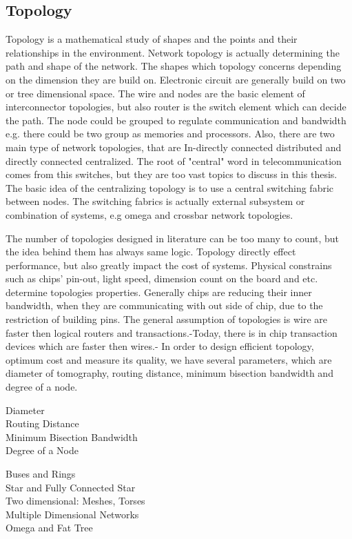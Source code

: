 \subsection{Topology}
Topology is a mathematical study of shapes and the points and their relationships in the environment. Network topology is actually determining the path and shape of the network. The shapes which topology concerns depending on the dimension they are build on. Electronic circuit are generally build on two or tree dimensional space. The wire and nodes are the basic element of interconnector topologies, but also router is the switch element which can decide the path. The node could be grouped to regulate communication and bandwidth e.g. there could be two group as memories and processors. Also, there are two main type of network topologies, that are In-directly connected distributed and directly connected centralized. The root of "central" word in telecommunication comes from this switches, but they are too vast topics to discuss in this thesis. The basic idea of the centralizing topology is to use a central switching fabric between nodes. The switching fabrics is actually external subsystem or combination of systems, e.g omega and crossbar network topologies\cite{0122007514}.

The number of topologies designed in literature can be too many to count, but the idea behind them has always same logic. Topology directly effect performance, but also greatly impact the cost of systems. Physical constrains such as chips' pin-out, light speed, dimension count on the board and etc. determine topologies properties. Generally chips are reducing their inner bandwidth, when they are communicating with out side of chip, due to the restriction of building pins\cite{hennessy2012computer}. The general assumption of topologies is wire are faster then logical routers and transactions.-Today, there is in chip transaction devices which are faster then wires\cite{hennessy2012computer}.- In order to design efficient topology, optimum cost and measure its quality, we have several parameters, which are diameter of tomography, routing distance, minimum bisection bandwidth and degree of a node.
\begin{description}
  \item[Diameter] 
  \item[Routing Distance] 
  \item[Minimum Bisection Bandwidth] 
  \item[Degree of a Node] 
\end{description}
\begin{description}
\item[Buses and Rings]
\item[Star and Fully Connected Star]
\item[Two dimensional: Meshes, Torses] 
\item[Multiple Dimensional Networks]  
\item[Omega and Fat Tree] 
\end{description}
